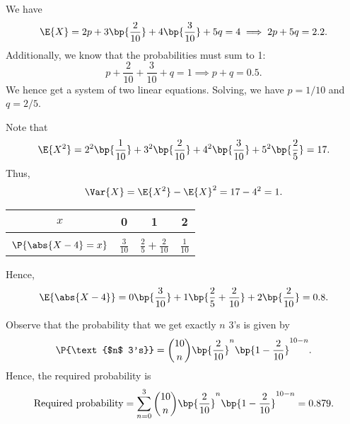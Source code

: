 \begin{solution}
    \begin{ppart}
        We have \[\E{X} = 2p + 3\bp{\frac2{10}} + 4\bp{\frac3{10}} + 5q = 4 \implies 2p + 5q = 2.2.\] Additionally, we know that the probabilities must sum to 1: \[p + \frac2{10} + \frac3{10} + q = 1 \implies p + q = 0.5.\] We hence get a system of two linear equations. Solving, we have $p = 1/10$ and $q = 2/5$.
    \end{ppart}
    \begin{ppart}
        Note that \[\E{X^2} = 2^2 \bp{\frac1{10}} + 3^2 \bp{\frac2{10}} + 4^2 \bp{\frac3{10}} + 5^2 \bp{\frac25} = 17.\] Thus, \[\Var{X} = \E{X^2} - \E{X}^2 = 17 - 4^2 = 1.\]
    \end{ppart}
    \begin{ppart}
        \begin{table}[H]
            \centering
            \begin{tabular}{|c|c|c|c|}
            \hline
            $x$ & 0 & 1 & 2 \\ \hline
            &&&\\[-1em]
            $\P{\abs{X - 4} = x}$ & $\frac3{10}$ & $\frac25 + \frac2{10}$ & $\frac1{10}$ \\[0.2em] \hline
            \end{tabular}
        \end{table}

        Hence, \[\E{\abs{X - 4}} = 0\bp{\frac3{10}} + 1\bp{\frac25 + \frac2{10}} + 2\bp{\frac2{10}} = 0.8.\]
    \end{ppart}
    \begin{ppart}
        Observe that the probability that we get exactly $n$ 3's is given by \[\P{\text{$n$ 3's}} = \binom{10}{n} \bp{\frac2{10}}^n \bp{1 - \frac2{10}}^{10-n}.\] Hence, the required probability is \[\text{Required probability} = \sum_{n = 0}^3 \binom{10}{n} \bp{\frac2{10}}^n \bp{1 - \frac2{10}}^{10-n} = 0.879.\]
    \end{ppart}
\end{solution}